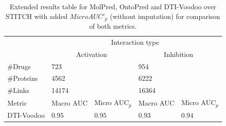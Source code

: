 \documentclass[]{article}
\newcommand{\name}{DTI-Voodoo}
\begin{document}
\clearpage
\begin{table}[ht]
	\centering
	\begin{tabular}{|p{2.0cm}|p{1cm}|p{1cm}|p{1cm}|p{1cm}|}
		\hline
		&\multicolumn{4}{c|}{Interaction type}\\
		&\multicolumn{2}{c|}{Activation}&\multicolumn{2}{c|}{Inhibition}\\
		\#Drugs & \multicolumn{2}{l|}{723} & \multicolumn{2}{l|}{954}\\
		\#Proteins&\multicolumn{2}{l|}{4562}&\multicolumn{2}{l|}{6222}\\
		\#Links&\multicolumn{2}{l|}{14174}&\multicolumn{2}{l|}{16364}\\
		\hline
		Metric&Macro AUC&Micro AUC$_p$&Macro AUC&Micro AUC$_p$\\
		\name&$0.95$&$0.95$&$0.93$&$0.94$\\
		\hline
		
	\end{tabular}
	\caption{Extended results table for MolPred, OntoPred and
		\name{} over STITCH with added $MicroAUC'_p$ (without
		imputation) for comparison of both metrics.}
\end{table}
\end{document}
